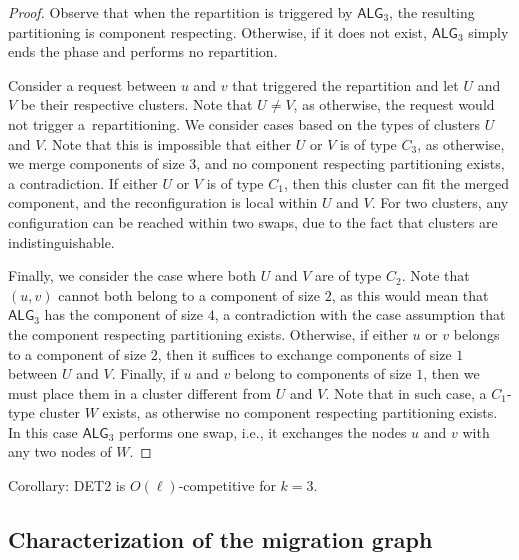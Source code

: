 \documentclass[manuscript,screen=true, review, anonymous]{acmart}
\newcommand{\TAlg}{{\ensuremath{\textsf{ALG}_{3}}}\xspace}
\begin{document}
\begin{proof}
    Observe that when the repartition is triggered by \TAlg, the resulting partitioning is component respecting.
  Otherwise, if it does not exist, \TAlg simply ends the phase and performs no repartition.

  
    Consider a request between $u$ and $v$ that triggered the repartition and let $U$ and $V$ be their respective clusters.
    Note that $U\neq V$,
	 as otherwise, the request would not trigger a~repartitioning.
	 We consider cases based on the types of clusters $U$ and $V$.
    Note that this is impossible that either $U$ or $V$ is of type $C_3$, as otherwise, we merge components of size $3$, and no component respecting partitioning exists, a contradiction.
    If either $U$ or $V$ is of type $C_1$, then this cluster can fit the merged component, and the reconfiguration is local within $U$ and $V$.
    For two clusters, any configuration can be reached within two swaps, due to the fact that clusters are indistinguishable.
  
    Finally, we consider the case where both $U$ and $V$ are of type $C_2$. Note that $(u,v)$ cannot both belong to a component of size $2$, as this would mean that \TAlg has the component of size $4$, a contradiction with the case assumption that the component respecting partitioning exists. 
    Otherwise, if either $u$ or $v$ belongs to a component of size $2$, then it suffices to exchange components of size $1$ between $U$ and $V$.
    Finally, if $u$ and $v$ belong to components of size $1$, then we must place them in a cluster different from $U$ and $V$.
    Note that in such case, a $C_1$-type cluster $W$ exists, as otherwise no component respecting partitioning exists. In this case \TAlg performs one swap, i.e., it exchanges the nodes $u$ and $v$ with any two nodes of $W$.
\end{proof}

Corollary: DET2 is $O(\ell)$-competitive for $k=3$.

\subsection{Characterization of the migration graph}
\end{document}
